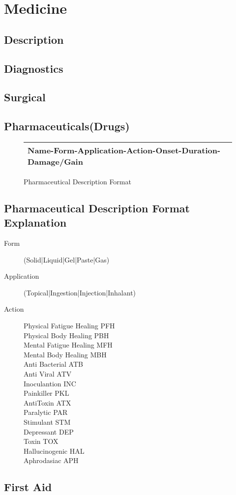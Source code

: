 \chapter{Medicine}
\section{Description}
\section{Diagnostics}
\section{Surgical}
\section{Pharmaceuticals(Drugs)}

\begin{figure}[htb]
\caption{Pharmaceutical De\-scrip\-tion Format}
	\begin{tabular}{||l||} \hline
	Name-Form-Application-Action-Onset-Duration-Damage/Gain \\ \hline
	\end{tabular}
\end{figure}

\section{Pharmaceutical Description Format Explanation}

\begin{description}
	\item[Form]
	(Solid|Liquid|Gel|Paste|Gas)
	\item[Application]
	(Topical|Ingestion|Injection|Inhalant)
	\item[Action]
	\begin{description}
		\item[Physical Fatigue Healing PFH]
		\item[Physical Body Healing    PBH]
		\item[Mental Fatigue Healing	 MFH]
		\item[Mental Body Healing      MBH]
		\item[Anti Bacterial           ATB]
		\item[Anti Viral               ATV]
		\item[Inoculantion             INC]
		\item[Painkiller               PKL]
		\item[AntiToxin                ATX]
		\item[Paralytic                PAR]
		\item[Stimulant                STM]
		\item[Depressant               DEP]
		\item[Toxin                    TOX]
		\item[Hallucinogenic           HAL]
		\item[Aphrodasiac              APH]
	\end{description}    
\end{description}

\section{First Aid}


